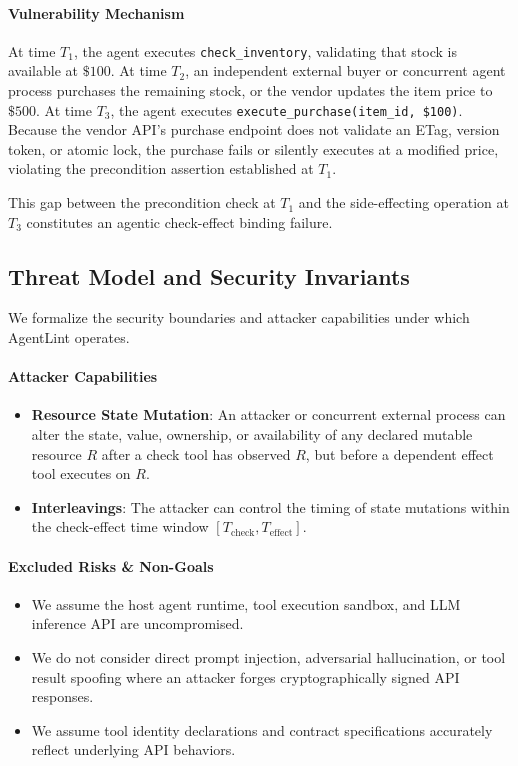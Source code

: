 \paragraph{Vulnerability Mechanism}
At time $T_1$, the agent executes \texttt{check\_inventory}, validating that stock is available at $\$100$. At time $T_2$, an independent external buyer or concurrent agent process purchases the remaining stock, or the vendor updates the item price to $\$500$. At time $T_3$, the agent executes \texttt{execute\_purchase(item\_id, \$100)}. Because the vendor API's purchase endpoint does not validate an ETag, version token, or atomic lock, the purchase fails or silently executes at a modified price, violating the precondition assertion established at $T_1$.

This gap between the precondition check at $T_1$ and the side-effecting operation at $T_3$ constitutes an agentic check-effect binding failure.

\subsection{Threat Model and Security Invariants}
We formalize the security boundaries and attacker capabilities under which AgentLint operates.

\paragraph{Attacker Capabilities}
\begin{itemize}
    \item \textbf{Resource State Mutation}: An attacker or concurrent external process can alter the state, value, ownership, or availability of any declared mutable resource $R$ after a check tool has observed $R$, but before a dependent effect tool executes on $R$.
    \item \textbf{Interleavings}: The attacker can control the timing of state mutations within the check-effect time window $[T_{\text{check}}, T_{\text{effect}}]$.
\end{itemize}

\paragraph{Excluded Risks \& Non-Goals}
\begin{itemize}
    \item We assume the host agent runtime, tool execution sandbox, and LLM inference API are uncompromised.
    \item We do not consider direct prompt injection, adversarial hallucination, or tool result spoofing where an attacker forges cryptographically signed API responses.
    \item We assume tool identity declarations and contract specifications accurately reflect underlying API behaviors.
\end{itemize}

